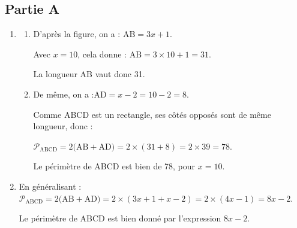 \subsection*{Partie A}
\begin{enumerate}
	\item \begin{enumerate}
		\item D'après la figure, on a : \quad $\mathrm{AB} = 3x + 1$.

		Avec $x = 10$, cela donne : \quad $\mathrm{AB} = 3 \times 10 + 1 = 31$.

		La longueur AB vaut donc 31.

		\item De même, on a :\quad $\mathrm{AD} = x - 2 = 10 - 2 = 8$.

		Comme ABCD est un rectangle, ses côtés opposés sont de même longueur, donc :

		$\mathcal{P}_{\mathrm{ABCD}} = 2\big(\mathrm{AB} + \mathrm{AD}\big) = 2\times (31 + 8) = 2\times 39 = 78$.

		Le périmètre de ABCD est bien de 78, pour $x=10$.
	\end{enumerate}
	\item En généralisant :\quad
	$\mathcal{P}_{\mathrm{ABCD}} = 2\big(\mathrm{AB} + \mathrm{AD}\big) = 2\times (3x + 1 + x - 2) = 2\times (4x - 1) = 8x - 2$.

	Le périmètre de ABCD est bien donné par l'expression \quad $8x-2$.
\end{enumerate}


